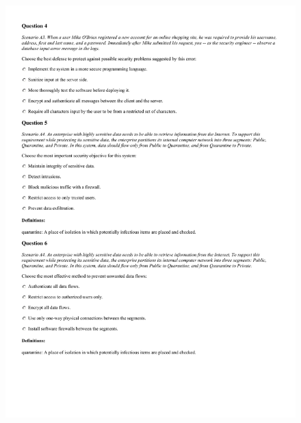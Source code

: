 \begin{figure}[!h]
    \begin{center}
    \advance\leftskip-3cm
    \advance\rightskip-3cm
    \includegraphics[scale=.25]{images/exam/correctly_formated_exam-03.jpg}
    \label{fig:correctly_formated_exam-03}
\end{center}
\end{figure}
